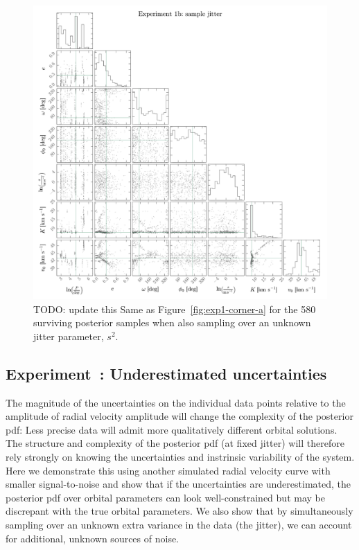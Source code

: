 \documentclass[manuscript, letterpaper]{aastex6}
\newcommand{\figname}{Figure}
\newcounter{expcounter}
\newcommand{\todo}[1]{{\color{red}TODO: #1}}
\begin{document}
\begin{figure}[p]
\begin{center}
\includegraphics[width=\textwidth]{figures/exp1-corner-b.pdf}
\end{center}
\caption{%
\todo{update this}
Same as \figname~\ref{fig:exp1-corner-a} for the 580 surviving posterior samples
when also sampling over an unknown jitter parameter, $s^2$.
\label{fig:exp1-corner-b}}
\end{figure}

\subsection{Experiment~: Underestimated uncertainties}

The magnitude of the uncertainties on the individual data points relative to the
amplitude of radial velocity amplitude will change the complexity of the
posterior pdf: Less precise data will admit more qualitatively different
orbital solutions.
The structure and complexity of the posterior pdf (at fixed jitter) will
therefore rely strongly on knowing the uncertainties and instrinsic variability
of the system.
Here we demonstrate this using another simulated radial velocity curve with
smaller signal-to-noise and show that if the uncertainties are underestimated,
the posterior pdf over orbital parameters can look well-constrained but may be
discrepant with the true orbital parameters.
We also show that by simultaneously sampling over an unknown extra variance in
the data (the jitter), we can account for additional, unknown sources of noise.
\end{document}
